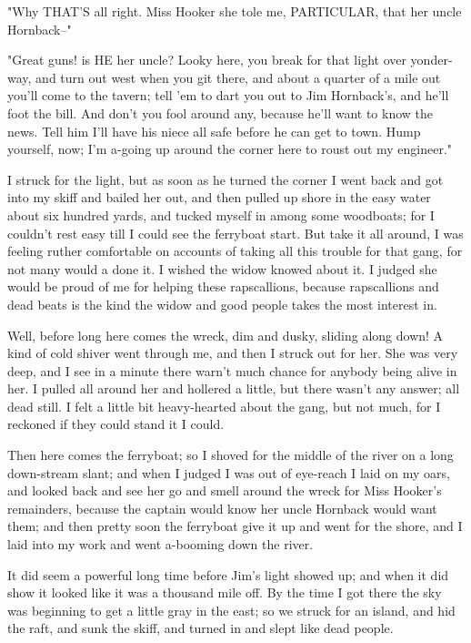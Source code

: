 "Why THAT'S all right.  Miss Hooker she tole me, PARTICULAR, that her
uncle Hornback--"

"Great guns! is HE her uncle?  Looky here, you break for that light over
yonder-way, and turn out west when you git there, and about a quarter of
a mile out you'll come to the tavern; tell 'em to dart you out to Jim
Hornback's, and he'll foot the bill.  And don't you fool around any,
because he'll want to know the news.  Tell him I'll have his niece all
safe before he can get to town.  Hump yourself, now; I'm a-going up
around the corner here to roust out my engineer."

I struck for the light, but as soon as he turned the corner I went back
and got into my skiff and bailed her out, and then pulled up shore in the
easy water about six hundred yards, and tucked myself in among some
woodboats; for I couldn't rest easy till I could see the ferryboat start.
But take it all around, I was feeling ruther comfortable on accounts of
taking all this trouble for that gang, for not many would a done it.  I
wished the widow knowed about it.  I judged she would be proud of me for
helping these rapscallions, because rapscallions and dead beats is the
kind the widow and good people takes the most interest in.

Well, before long here comes the wreck, dim and dusky, sliding along
down! A kind of cold shiver went through me, and then I struck out for
her.  She was very deep, and I see in a minute there warn't much chance
for anybody being alive in her.  I pulled all around her and hollered a
little, but there wasn't any answer; all dead still.  I felt a little bit
heavy-hearted about the gang, but not much, for I reckoned if they could
stand it I could.

Then here comes the ferryboat; so I shoved for the middle of the river on
a long down-stream slant; and when I judged I was out of eye-reach I laid
on my oars, and looked back and see her go and smell around the wreck for
Miss Hooker's remainders, because the captain would know her uncle
Hornback would want them; and then pretty soon the ferryboat give it up
and went for the shore, and I laid into my work and went a-booming down
the river.

It did seem a powerful long time before Jim's light showed up; and when
it did show it looked like it was a thousand mile off.  By the time I got
there the sky was beginning to get a little gray in the east; so we
struck for an island, and hid the raft, and sunk the skiff, and turned in
and slept like dead people.





